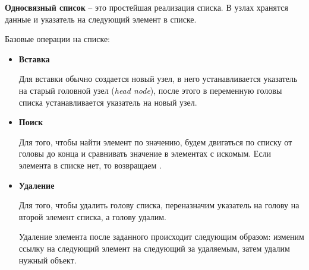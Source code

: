 \textbf{Односвязный список} -- это простейшая реализация списка. В узлах хранятся данные и указатель на следующий элемент в списке.

Базовые операции на списке:
\begin{itemize}
    \item
          \textbf{Вставка}

          Для вставки обычно создается новый узел, в него устанавливается указатель на старый головной узел (\textit{head node}), после этого в переменную головы списка устанавливается указатель на новый узел.
    \item
          \textbf{Поиск}

          Для того, чтобы найти элемент по значению, будем двигаться по списку от головы до конца и сравнивать значение в элементах с искомым. Если элемента в списке нет, то возвращаем .
    \item
          \textbf{Удаление}

          Для того, чтобы удалить голову списка, переназначим указатель на голову на второй элемент списка, а голову удалим.

          Удаление элемента после заданного происходит следующим образом: изменим ссылку на следующий элемент на следующий за удаляемым, затем удалим нужный объект.
\end{itemize}

